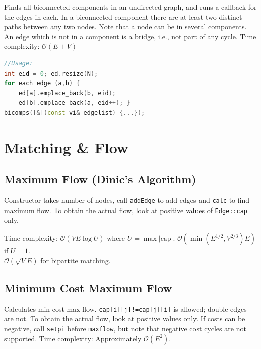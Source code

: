 \documentclass{article}
\begin{document}
Finds all biconnected components in an undirected graph, and
runs a callback for the edges in each. In a biconnected component there
are at least two distinct paths between any two nodes. Note that a node can
be in several components. An edge which is not in a component is a bridge,
i.e., not part of any cycle. Time complexity: $\mathcal{O}(E + V)$



\begin{lstlisting}[language=C++]
//Usage:
int eid = 0; ed.resize(N);
for each edge (a,b) {
    ed[a].emplace_back(b, eid);
    ed[b].emplace_back(a, eid++); }
bicomps([&](const vi& edgelist) {...});
\end{lstlisting}

\pagebreak

\section*{Matching \& Flow}


\subsection*{Maximum Flow (Dinic's Algorithm)}

Constructor takes number of nodes, call \lstinline{addEdge} to add edges and \lstinline{calc} to find maximum flow.
To obtain the actual flow, look at positive values of \lstinline{Edge::cap} only.

Time complexity: $\mathcal{O}(VE\log U)$ where $U = \max |\text{cap}|$.
$\mathcal{O}(\min(E^{1/2}, V^{2/3})E)$ if $U = 1$.\\
$\mathcal{O}(\sqrt{V}E)$ for bipartite matching.



\subsection*{Minimum Cost Maximum Flow}

Calculates min-cost max-flow. \lstinline{cap[i][j]!=cap[j][i]} is allowed; double edges are not. To obtain the actual flow, look at positive values only.
If costs can be negative, call \lstinline{setpi} before \lstinline{maxflow}, but note that negative cost cycles are not supported.
Time complexity: Approximately $\mathcal{O}(E^2)$.


\end{document}
